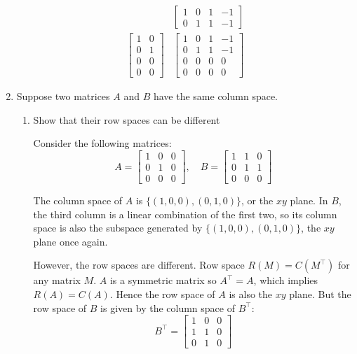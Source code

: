 \documentclass{scrartcl}
\begin{document}
\begin{enumerate}
\begin{align*}
	&\begin{bmatrix}
		1 & 0 & 1 & -1 \\ 0 & 1 & 1 & -1
	\end{bmatrix}\\
	\begin{bmatrix}
		1 & 0 \\ 0 & 1 \\ 0 & 0 \\ 0 & 0
	\end{bmatrix}&\begin{bmatrix}
	1 & 0 & 1 & -1 \\ 0 & 1 & 1 & -1 \\ 0 & 0 & 0 & 0 \\ 0 & 0 & 0 & 0 
\end{bmatrix}
\end{align*}

\item Suppose two matrices $A$ and $B$ have the same column space.
\begin{enumerate}
	\item Show that their row spaces can be different

Consider the following matrices:
$$A = \begin{bmatrix}
	1 & 0 & 0 \\ 0 & 1 & 0 \\ 0 & 0 & 0
\end{bmatrix}, \quad
B = \begin{bmatrix}
	1 & 1 & 0 \\ 0 & 1 & 1 \\ 0 & 0 & 0
\end{bmatrix}$$

The column space of $A$ is $\{(1, 0, 0), (0, 1, 0)\}$, or the $xy$ plane. In $B$, the third column is a linear combination of the first two, so its column space is also the subspace generated by $\{(1, 0, 0), (0, 1, 0)\}$, the $xy$ plane once again.

However, the row spaces are different. Row space $R(M) = C(M^\top)$ for any matrix $M$. $A$ is a symmetric matrix so $A^\top = A$, which implies $R(A) = C(A)$. Hence the row space of $A$ is also the $xy$ plane. But the row space of $B$ is given by the column space of $B^\top$:
$$B^\top = \begin{bmatrix}
	1 &0 & 0 \\ 1 & 1 & 0 \\ 0 & 1 & 0
\end{bmatrix}$$


\end{enumerate}
\end{enumerate}
\end{document}
